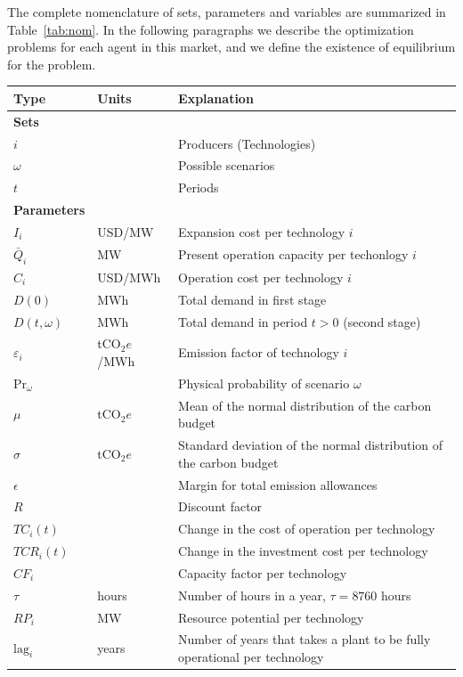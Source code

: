 \documentclass[11pt, letterpaper]{article}
\begin{document}
\smallskip
The complete nomenclature of sets, parameters and variables are summarized in Table~\ref{tab:nom}. In the following paragraphs we describe the optimization problems for each agent in this market, and we define the existence of equilibrium for the problem.

\smallskip
\begin{table}
\small
    \centering
    \begin{tabular}{  l l l } 
    \hline
 \textbf{Type} &   \textbf{Units} &   \textbf{Explanation} \\ 
 \hline
 \textbf{Sets}  & &   \\ 
 $i$  & &  Producers (Technologies) \\  
 $\omega$  & & Possible scenarios \\ 
 $t$  & & Periods \\
 \hline
 \textbf{Parameters}  &  &  \\
 $I_i$  & USD/MW & Expansion cost per technology $i$ \\  
 $\bar{Q}_i$ & MW & Present operation capacity  per techonlogy $i$ \\ 
 $C_i$ &  USD/MWh & Operation cost per technology $i$ \\
 $D(0)$ &  MWh & Total demand in first stage \\
 $D(t,\omega)$ &  MWh & Total demand in period $t > 0$ (second stage) \\
 $\varepsilon_i$ &  tCO$_2e$/MWh  & Emission factor of technology $i$\\
 Pr$_\omega$ &  & Physical probability of scenario $\omega$ \\
 $\mu$ &  tCO$_2e$ & Mean of the normal distribution of the carbon budget \\
  $\sigma$ &  tCO$_2e$ & Standard deviation of the normal distribution of the carbon budget \\
  $\epsilon$ &  & Margin for total emission allowances \\
  $R$ & & Discount factor \\
  $TC_i(t)$ &  & Change in the cost of operation per technology \\
  $TCR_i(t)$ & & Change in the investment cost per technology \\
  $CF_i$ &  & Capacity factor per technology\\
  $\tau$ &  hours&  Number of hours in a year, $\tau=8760$ hours\\
   $RP_i$  &   MW &  Resource potential per technology \\
   $\textrm{lag}_i$ & years & Number of years that takes a plant to be fully operational per technology\\

\end{tabular}
\end{table}
\end{document}

